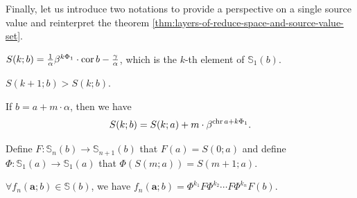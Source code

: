 Finally, let us introduce two notations to provide a perspective on a single source value and reinterpret the theorem \cref{thm:layers-of-reduce-space-and-source-value-set}.
\begin{definition}
    $S(k; b) = \frac{1}{\alpha}\beta^{k\Phi_1}\cdot\operatorname{cor} b - \frac{\gamma}{\alpha}$, which is the $k$-th element of $\mathbb{S}_1(b)$.
\end{definition}
\begin{proposition}
    $S(k + 1; b) > S(k; b)$.
\end{proposition}
\begin{proposition}\label{prop:congrunce-transform}
    If $b = a + m\cdot \alpha$, then we have
    \[ S(k; b) = S(k; a) + m\cdot\beta^{\operatorname{chr} a + k\Phi_1}. \]
\end{proposition}
\begin{definition}
    Define $F: \mathbb{S}_n(b)\to\mathbb{S}_{n+1}(b)$ that $F(a) = S(0; a)$ and define $\Phi: \mathbb{S}_1(a)\to \mathbb{S}_1(a)$ that $\Phi(S(m;a)) = S(m + 1;a)$.
\end{definition}
\begin{theorem}\label{thm:f_n-by-F-and-Phi}
    $\forall f_{n}(\bm{a};b)\in\mathbb{S}(b)$, we have $f_{n}(\bm{a};b) = \Phi^{k_{1}}F\Phi^{k_{2}}\cdots F\Phi^{k_{n}}F(b)$.
\end{theorem}
